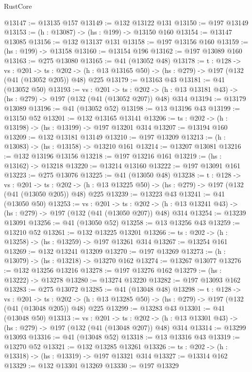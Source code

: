 \begin{lexlean}{RustCore}
\begin{coremodule}
@13147 := @13135 @157
@13149 := @132 @13122 @131
@13150 := @197 @13149
@13153 := (h : @13087) -> (hs : @199) -> @13150 @160
@13154 := @13147 @13085
@13156 := @132 @13137 @131
@13158 := @197 @13156 @160
@13159 := (hs : @199) -> @13158
@13160 := @13154 @196
@13162 := @197 @13089 @160
@13163 := @275 @13080
@13165 := @41 (@13052 @48)
@13178 := {t : @128} ->
  {vs : @201} ->
  {ts : @202} -> (h : @13 @13165 @50) -> (hs : @279) -> @197 (@132 (@41 (@13052 @205)) @48) @225
@13179 := @13163 @43
@13181 := @41 (@13052 @50)
@13193 := {vs : @201} ->
  {ts : @202} -> (h : @13 @13181 @43) -> (hs : @279) -> @197 (@132 (@41 (@13052 @207)) @48) @314
@13194 := @13179 @13089
@13196 := @41 (@13052 @52)
@13198 := @13 @13196 @43
@13199 := @13150 @52
@13201 := @132 @13165 @13141
@13206 := {ts : @202} -> (h : @13198) -> (hs : @13199) -> @197 @13201 @314
@13207 := @13194 @160
@13209 := @132 @13181 @13149
@13210 := @197 @13209
@13213 := (h : @13083) -> (hs : @13158) -> @13210 @161
@13214 := @13207 @13081
@13216 := @132 @13196 @13156
@13218 := @197 @13216 @161
@13219 := (hs : @13162) -> @13218
@13220 := @13214 @13160
@13222 := @197 @13091 @161
@13223 := @275 @13076
@13225 := @41 (@13050 @48)
@13238 := {t : @128} ->
  {vs : @201} ->
  {ts : @202} -> (h : @13 @13225 @50) -> (hs : @279) -> @197 (@132 (@41 (@13050 @205)) @48) @225
@13239 := @13223 @43
@13241 := @41 (@13050 @50)
@13253 := {vs : @201} ->
  {ts : @202} -> (h : @13 @13241 @43) -> (hs : @279) -> @197 (@132 (@41 (@13050 @207)) @48) @314
@13254 := @13239 @13091
@13256 := @41 (@13050 @52)
@13258 := @13 @13256 @43
@13259 := @13210 @52
@13261 := @132 @13225 @13201
@13266 := {ts : @202} -> (h : @13258) -> (hs : @13259) -> @197 @13261 @314
@13267 := @13254 @161
@13269 := @132 @13241 @13209
@13270 := @197 @13269
@13273 := (h : @13079) -> (hs : @13218) -> @13270 @162
@13274 := @13267 @13077
@13276 := @132 @13256 @13216
@13278 := @197 @13276 @162
@13279 := (hs : @13222) -> @13278
@13280 := @13274 @13220
@13282 := @197 @13093 @162
@13283 := @275 @13072
@13285 := @41 (@13048 @48)
@13298 := {t : @128} ->
  {vs : @201} ->
  {ts : @202} -> (h : @13 @13285 @50) -> (hs : @279) -> @197 (@132 (@41 (@13048 @205)) @48) @225
@13299 := @13283 @43
@13301 := @41 (@13048 @50)
@13313 := {vs : @201} ->
  {ts : @202} -> (h : @13 @13301 @43) -> (hs : @279) -> @197 (@132 (@41 (@13048 @207)) @48) @314
@13314 := @13299 @13093
@13316 := @41 (@13048 @52)
@13318 := @13 @13316 @43
@13319 := @13270 @52
@13321 := @132 @13285 @13261
@13326 := {ts : @202} -> (h : @13318) -> (hs : @13319) -> @197 @13321 @314
@13327 := @13314 @162
@13329 := @132 @13301 @13269
@13330 := @197 @13329

\end{coremodule}
\end{lexlean}
